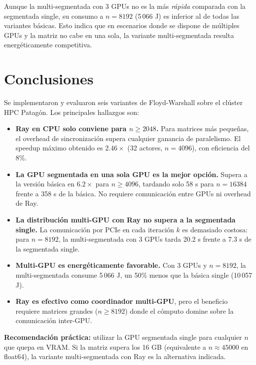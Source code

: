 \documentclass[conference]{IEEEtran}
\newcommand{\FW}{Floyd-Warshall}
\begin{document}
Aunque la multi-segmentada con 3 GPUs no es la más \textit{rápida}
comparada con la segmentada single, su consumo a $n=8192$ (5\,066 J)
es inferior al de todas las variantes básicas. Esto indica que en
escenarios donde se dispone de múltiples GPUs y la matriz no cabe en
una sola, la variante multi-segmentada resulta energéticamente
competitiva.

\section{Conclusiones}
\label{sec:conclusiones}

Se implementaron y evaluaron seis variantes de \FW{} sobre el clúster
HPC Patagón. Los principales hallazgos son:

\begin{itemize}
  \item \textbf{Ray en CPU solo conviene para $n \geq 2048$.} Para
        matrices más pequeñas, el overhead de sincronización supera
        cualquier ganancia de paralelismo. El speedup máximo obtenido
        es $2.46\times$ (32 actores, $n=4096$), con eficiencia del 8\%.

  \item \textbf{La GPU segmentada en una sola GPU es la mejor opción.}
        Supera a la versión básica en $6.2\times$ para $n \geq 4096$,
        tardando solo 58 s para $n=16384$ frente a 358 s de la básica.
        No requiere comunicación entre GPUs ni overhead de Ray.

  \item \textbf{La distribución multi-GPU con Ray no supera a la
        segmentada single.} La comunicación por PCIe en cada iteración
        $k$ es demasiado costosa: para $n=8192$, la multi-segmentada
        con 3 GPUs tarda 20.2 s frente a 7.3 s de la segmentada single.

  \item \textbf{Multi-GPU es energéticamente favorable.} Con 3 GPUs y
        $n=8192$, la multi-segmentada consume 5\,066 J, un 50\% menos
        que la básica single (10\,057 J).

  \item \textbf{Ray es efectivo como coordinador multi-GPU}, pero el
        beneficio requiere matrices grandes ($n \geq 8192$) donde el
        cómputo domine sobre la comunicación inter-GPU.
\end{itemize}

\textbf{Recomendación práctica:} utilizar la GPU segmentada single para
cualquier $n$ que quepa en VRAM. Si la matriz supera los 16 GB
(equivalente a $n \approx 45000$ en float64), la variante
multi-segmentada con Ray es la alternativa indicada.
\end{document}
